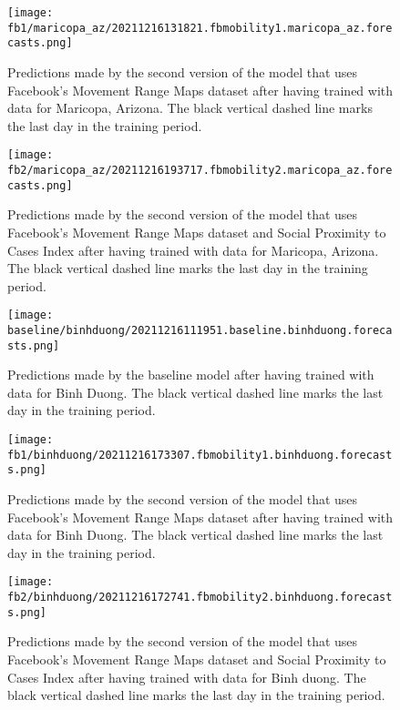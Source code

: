 \begin{figure}[!htb]
    \centering
    \texttt{[image: fb1/maricopa\_az/20211216131821.fbmobility1.maricopa\_az.forecasts.png]}
    \caption{Predictions made by the second version of the model that uses Facebook's Movement Range Maps dataset after having trained with data for Maricopa, Arizona. The black vertical dashed line marks the last day in the training period.}
    \label{fig:predictions-maricopa-fb1}
\end{figure}

\begin{figure}[!htb]
    \centering
    \texttt{[image: fb2/maricopa\_az/20211216193717.fbmobility2.maricopa\_az.forecasts.png]}
    \caption{Predictions made by the second version of the model that uses Facebook's Movement Range Maps dataset and Social Proximity to Cases Index after having trained with data for Maricopa, Arizona. The black vertical dashed line marks the last day in the training period.}
    \label{fig:predictions-maricopa-fb2}
\end{figure}


\begin{figure}[!htb]
    \centering
    \texttt{[image: baseline/binhduong/20211216111951.baseline.binhduong.forecasts.png]}
    \caption{Predictions made by the baseline model after having trained with data for Binh Duong. The black vertical dashed line marks the last day in the training period.}
    \label{fig:predictions-binhduong-baseline}
\end{figure}

\begin{figure}[!htb]
    \centering
    \texttt{[image: fb1/binhduong/20211216173307.fbmobility1.binhduong.forecasts.png]}
    \caption{Predictions made by the second version of the model that uses Facebook's Movement Range Maps dataset after having trained with data for Binh Duong. The black vertical dashed line marks the last day in the training period.}
    \label{fig:predictions-binhduong-fb1}
\end{figure}

\begin{figure}[!htb]
    \centering
    \texttt{[image: fb2/binhduong/20211216172741.fbmobility2.binhduong.forecasts.png]}
    \caption{Predictions made by the second version of the model that uses Facebook's Movement Range Maps dataset and Social Proximity to Cases Index after having trained with data for Binh duong. The black vertical dashed line marks the last day in the training period.}
    \label{fig:predictions-binhduong-fb2}
\end{figure}

